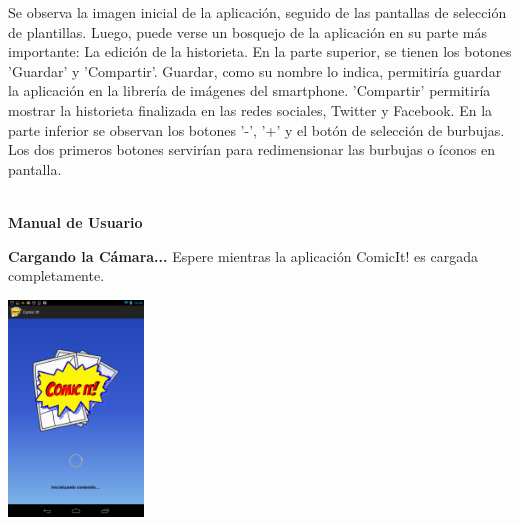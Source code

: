 \documentclass[12pt]{report}
\begin{document}
\begingroup
			\vspace{3mm}
		\endgroup
Se observa la imagen inicial de la aplicación, seguido de las pantallas de selección de plantillas. Luego, puede verse un bosquejo de la aplicación en su parte más importante: La edición de la historieta.
 \newline
 \newline
En la parte superior, se tienen los botones 'Guardar' y 'Compartir'. Guardar, como su nombre lo indica, permitiría guardar la aplicación en la librería de imágenes del smartphone. 'Compartir' permitiría mostrar la historieta finalizada en las redes sociales, Twitter y Facebook.
 \newline
 \newline
En la parte inferior se observan los botones '-', '+'  y el botón de selección de burbujas. Los dos primeros botones servirían para redimensionar las burbujas o íconos en pantalla.

\newpage
\begin{center}	
	\vspace{1em}
		\Huge{\textbf{\\Manual de Usuario	\vspace{1em}}}
	\end{center}	


\begingroup
		\large{
			\textbf{
				Cargando la Cámara...
				\newline
				\newline
			}
		}
	\endgroup
Espere mientras la aplicación ComicIt! es cargada completamente.


	\begin{center}
		\begingroup
			\includegraphics[width=0.27\textwidth]{imagenes_usuario/cargar.png}
		\endgroup
	\end{center}
\end{document}
